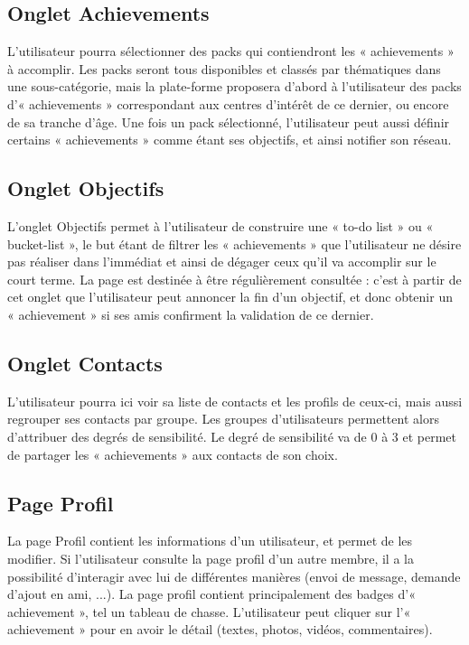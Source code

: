 \documentclass{life-fr}
\begin{document}
\subsection{Onglet Achievements}

L'utilisateur pourra sélectionner des packs qui contiendront les « achievements » à accomplir. Les packs seront tous disponibles et classés par thématiques dans une sous-catégorie, mais la plate-forme proposera d'abord à l'utilisateur des packs d'« achievements » correspondant aux centres d'intérêt de ce dernier, ou encore de sa tranche d'âge. Une fois un pack sélectionné, l'utilisateur peut aussi définir certains « achievements » comme étant ses objectifs, et ainsi notifier son réseau.

\subsection{Onglet Objectifs}

L'onglet Objectifs permet à l'utilisateur de construire une « to-do list » ou « bucket-list », le but étant de filtrer les « achievements » que l'utilisateur ne désire pas réaliser dans l'immédiat et ainsi de dégager ceux qu'il va accomplir sur le court terme. La page est destinée à être régulièrement consultée : c'est à partir de cet onglet que l'utilisateur peut annoncer la fin d'un objectif, et donc obtenir un « achievement » si ses amis confirment la validation de ce dernier.

\subsection{Onglet Contacts}

L'utilisateur pourra ici voir sa liste de contacts et les profils de ceux-ci, mais aussi regrouper ses contacts par groupe. Les groupes d'utilisateurs permettent alors d'attribuer des degrés de sensibilité.
Le degré de sensibilité va de 0 à 3 et permet de partager les « achievements » aux contacts de son choix.

\subsection{Page Profil}
La page Profil contient les informations d'un utilisateur, et permet de les modifier. Si l'utilisateur consulte la page profil d'un autre membre, il a la possibilité d'interagir avec lui de différentes manières (envoi de message, demande d'ajout en ami, ...).
La page profil contient principalement des badges d'« achievement », tel un tableau de chasse. L'utilisateur peut cliquer sur l'« achievement » pour en avoir le détail (textes, photos, vidéos, commentaires).
\end{document}
